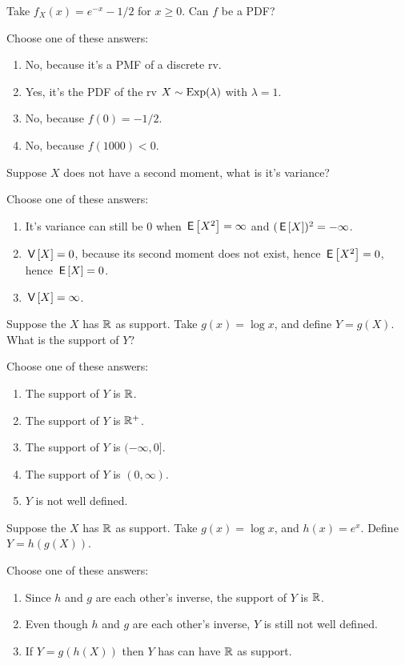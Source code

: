 \documentclass[poll_tutorial_format]{subfiles}
\begin{document}
\begin{exercise}
Take $f_X(x) = e^{-x}-1/2$ for $x\geq 0$.  Can $f$ be a PDF?

Choose one of these answers:
\begin{enumerate}
\item No, because it's a PMF of a discrete rv.
\item Yes, it's the PDF of the rv $X\sim\mathrm{Exp}(\lambda)$ with $\lambda = 1$.
\item No, because $f(0)  = -1/2$.
\item No, because $f(1000) < 0$.
\end{enumerate}
\end{exercise}


\begin{exercise}
Suppose $X$ does not have a second moment, what is it's variance?

Choose one of these answers:
\begin{enumerate}
\item It's variance can still be $0$ when $\,\mathsf{E}\left[X^2\right] = \infty$ and $(\,\mathsf{E}\left[X\right])^2=-\infty$.
\item $\,\mathsf{V}\left[X\right]=0$, because its second moment does not exist, hence $\,\mathsf{E}\left[X^2\right]=0$, hence $\,\mathsf{E}\left[X\right]=0$.
\item $\,\mathsf{V}\left[X\right] = \infty$.
\end{enumerate}
\end{exercise}

\begin{exercise}
Suppose the $X$ has  $\mathbb{R}$ as support. Take $g(x) = \log x$, and define $Y = g(X)$. What is the support of $Y$?

Choose one of these answers:
\begin{enumerate}
\item The support of $Y$ is $\mathbb{R}$.
\item The support of $Y$ is $\mathbb{R}^+$.
\item The support of $Y$ is $(-\infty, 0]$.
\item The support of $Y$ is $(0, \infty)$.
\item $Y$ is not well defined.
\end{enumerate}

\end{exercise}

\begin{exercise}
Suppose the $X$ has  $\mathbb{R}$ as support. Take $g(x) = \log x$, and $h(x) = e^{x}$. Define $Y = h(g(X))$.

Choose one of these answers:
\begin{enumerate}
\item Since $h$ and $g$ are each other's inverse, the support of $Y$ is $\mathbb{R}$.
\item Even though $h$ and $g$ are each other's inverse, $Y$ is still not well defined.
\item If $Y=g(h(X))$ then $Y$ has can have $\mathbb{R}$ as support.
\end{enumerate}

\end{exercise}
\end{document}
